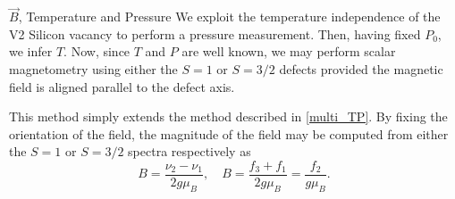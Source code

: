 \begin{proposal}{$\vec{B}$, Temperature and Pressure}
    We exploit the temperature independence of the V2 Silicon vacancy to perform a pressure measurement. Then, having fixed $P_0$, we infer $T$. Now, since $T$ and $P$ are well known, we may perform scalar magnetometry using either the $S=1$ or $S=3/2$ defects provided the magnetic field is aligned parallel to the defect axis. 
\end{proposal}

This method simply extends the method described in \ref{multi_TP}. By fixing the orientation of the field, the magnitude of the field may be computed from either the $S=1$ or $S=3/2$ spectra respectively as 
\begin{equation}
    B = \frac{\nu_2 - \nu_1}{2 g\mu_B }, \quad B = \frac{f_3 + f_1}{2 g \mu_B } = \frac{f_2}{g \mu_B}.  
    \label{eq:}
\end{equation}

%
%
%
%






